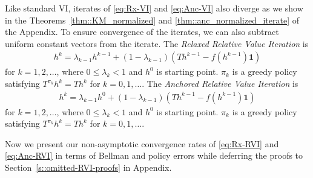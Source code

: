 \documentclass{article} %
\begin{document}
Like standard VI, iterates of \ref{eq:Rx-VI} and \ref{eq:Anc-VI} also diverge as we show in the Theorems~\ref{thm::KM_normalized} and \ref{thm::anc_normalized_iterate} of the Appendix. To ensure convergence of the iterates, we can also subtract uniform constant vectors from the iterate. The \emph{Relaxed Relative Value Iteration} is
\begin{align}
    h^{k} = \lambda_{k-1} h^{k-1}+ (1- \lambda_{k-1})(Th^{k-1} -f(h^{k-1})\mathbf{1}) \tag{Rx-RVI}
    \label{eq:Rx-RVI}
\end{align}
for $k=1,2,\dots$, where $0 \le \lambda_{k}<1$ and $h^0$ is starting point. $\pi_k$ is a greedy policy satisfying $T^{\pi_k}h^k= Th^k$ for $k=0,1,\dots$. The \emph{Anchored Relative Value Iteration} is
\begin{align}
    h^{k} = \lambda_{k-1} h^0+ (1- \lambda_{k-1})(Th^{k-1} - f(h^{k-1})\mathbf{1}) \tag{Anc-RVI}
    \label{eq:Anc-RVI}
\end{align}
for $k=1,2,\dots$, where $0 \le \lambda_{k}<1$ and $h^0$ is starting point. $\pi_k$ is a greedy policy satisfying $T^{\pi_k}h^k= Th^k$ for $k=0,1,\dots$.

Now we present our non-asymptotic convergence rates of \ref{eq:Rx-RVI} and \ref{eq:Anc-RVI} in terms of Bellman and policy errors while deferring the proofs to Section~\ref{s::omitted-RVI-proofs} in Appendix.
\end{document}
